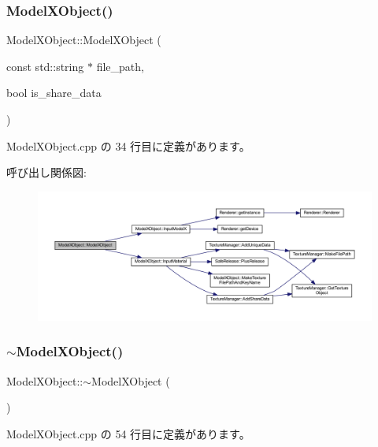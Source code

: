 \subsubsection{\texorpdfstring{Model\+X\+Object()}{ModelXObject()}}
{\footnotesize\ttfamily Model\+X\+Object\+::\+Model\+X\+Object (\begin{DoxyParamCaption}\item[{const std\+::string $\ast$}]{file\+\_\+path,  }\item[{bool}]{is\+\_\+share\+\_\+data }\end{DoxyParamCaption})}



 Model\+X\+Object.\+cpp の 34 行目に定義があります。

呼び出し関係図\+:
\nopagebreak
\begin{figure}[H]
\begin{center}
\leavevmode
\includegraphics[width=350pt]{class_model_x_object_a83bd334b1f24a69c4cbdcaa62464ff31_cgraph}
\end{center}
\end{figure}
\mbox{\label{class_model_x_object_a33553f8ab78dfd3c9d571a048ae85324}} 
\subsubsection{\texorpdfstring{$\sim$\+Model\+X\+Object()}{~ModelXObject()}}
{\footnotesize\ttfamily Model\+X\+Object\+::$\sim$\+Model\+X\+Object (\begin{DoxyParamCaption}{ }\end{DoxyParamCaption})\hspace{0.3cm}{\ttfamily [virtual]}}



 Model\+X\+Object.\+cpp の 54 行目に定義があります。

